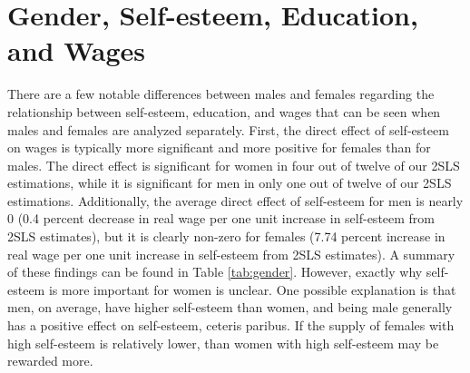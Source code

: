 \documentclass[12pt]{report}
\begin{document}
\section*{Gender, Self-esteem, Education, and Wages}

There are a few notable differences between males and females regarding the relationship between self-esteem, education, and wages that can be seen when males and females are analyzed separately. First, the direct effect of self-esteem on wages is typically more significant and more positive for females than for males. The direct effect is significant for women in four out of twelve of our 2SLS estimations, while it is significant for men in only one out of twelve of our 2SLS estimations. Additionally, the average direct effect of self-esteem for men is nearly 0 (0.4 percent decrease in real wage per one unit increase in self-esteem from 2SLS estimates), but it is clearly non-zero for females (7.74 percent increase in real wage per one unit increase in self-esteem from 2SLS estimates). A summary of these findings can be found in Table \ref{tab:gender}. However, exactly why self-esteem is more important for women is unclear. One possible explanation is that men, on average, have higher self-esteem than women, and being male generally has a positive effect on self-esteem, ceteris paribus. If the supply of females with high self-esteem is relatively lower, than women with high self-esteem may be rewarded more.
\end{document}
